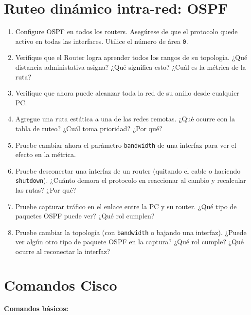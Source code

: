 \documentclass[a4paper,10pt]{article}
\begin{document}
\section{Ruteo dinámico intra-red: OSPF}\label{sec:ospf1}

\begin{enumerate}
    \item Configure OSPF en todos los routers. Asegúrese de que el protocolo quede activo
en todas las interfaces. Utilice el número de área \texttt{0}.

    \item Verifique que el Router logra aprender todos los rangos de su topología. ¿Qué distancia administativa asigna? ¿Qué significa esto? ¿Cuál es la métrica de la ruta?
    
    \item Verifique que ahora puede alcanzar toda la red de su anillo desde cualquier PC.
    
    \item Agregue una ruta estática a una de las redes remotas. ¿Qué ocurre con la tabla de ruteo? ¿Cuál toma prioridad? ¿Por qué?
    
    \item Pruebe cambiar ahora el parámetro \texttt{bandwidth} de una interfaz para ver el efecto en la métrica.
    
    \item Pruebe desconectar una interfaz de un router (quitando el cable o haciendo \texttt{shutdown}). ¿Cuánto demora el protocolo en reaccionar al cambio y recalcular las rutas? ¿Por qué?
    
    \item Pruebe capturar tráfico en el enlace entre la PC y su router. ¿Qué tipo de paquetes OSPF puede ver? ¿Qué rol cumplen?
    
    \item Pruebe cambiar la topología (con \texttt{bandwidth} o bajando una interfaz). ¿Puede ver algún otro tipo de paquete OSPF en la captura? ¿Qué rol cumple? ¿Qué ocurre al reconectar la interfaz?


\end{enumerate}

\appendix

\section{Comandos Cisco}

\textbf{Comandos básicos:}
\end{document}
